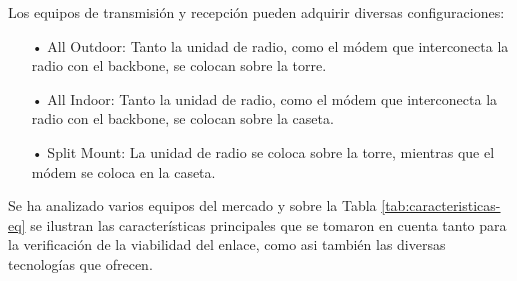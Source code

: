  
Los equipos de transmisión y recepción pueden adquirir diversas configuraciones:

\begin{enumerate}
\item[•]All Outdoor: Tanto la unidad de radio, como el módem que interconecta la radio con el backbone, se colocan sobre la torre.

\item[•]All Indoor: Tanto la unidad de radio, como el módem que interconecta la radio con el backbone, se colocan sobre la caseta.

\item[•]Split Mount: La unidad de radio se coloca sobre la torre, mientras que el módem se coloca en la caseta.
\end{enumerate}


Se ha analizado varios equipos del mercado y sobre la Tabla \ref{tab:caracteristicas-eq} se ilustran las características principales que se tomaron en cuenta tanto para la verificación de la viabilidad del enlace, como asi también las diversas tecnologías que ofrecen.

